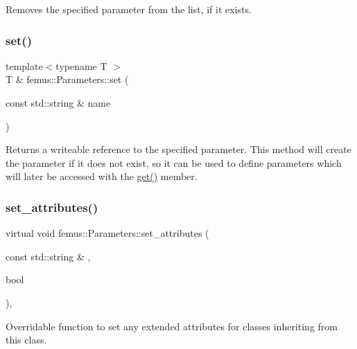 Removes the specified parameter from the list, if it exists. \mbox{\label{classfemus_1_1_parameters_a552a70edef7b7d9119b1cd4797af776b}} 
\subsubsection{\texorpdfstring{set()}{set()}}
{\footnotesize\ttfamily template$<$typename T $>$ \\
T \& femus\+::\+Parameters\+::set (\begin{DoxyParamCaption}\item[{const std\+::string \&}]{name }\end{DoxyParamCaption})\hspace{0.3cm}{\ttfamily [inline]}}

\begin{DoxyReturn}{Returns}
a writeable reference to the specified parameter. This method will create the parameter if it does not exist, so it can be used to define parameters which will later be accessed with the {\ttfamily \mbox{\hyperlink{classfemus_1_1_parameters_a419ddd3d0965dbca868a5072249b8374}{get()}}} member. 
\end{DoxyReturn}
\mbox{\label{classfemus_1_1_parameters_a1e69c71e7ac3a0a6a91c65ac1d029deb}} 
\subsubsection{\texorpdfstring{set\+\_\+attributes()}{set\_attributes()}}
{\footnotesize\ttfamily virtual void femus\+::\+Parameters\+::set\+\_\+attributes (\begin{DoxyParamCaption}\item[{const std\+::string \&}]{,  }\item[{bool}]{ }\end{DoxyParamCaption})\hspace{0.3cm}{\ttfamily [inline]}, {\ttfamily [virtual]}}

Overridable function to set any extended attributes for classes inheriting from this class. 


